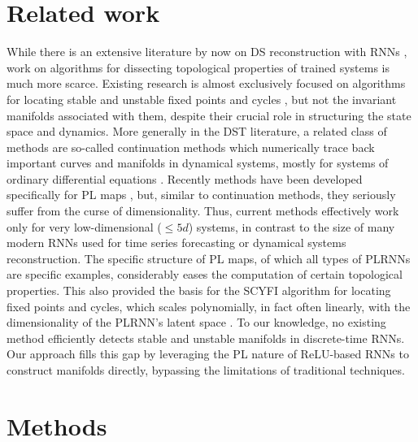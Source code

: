 \documentclass{article}
\theoremstyle{example}
\theoremstyle{plain}
\theoremstyle{definition}
\theoremstyle{remark}
\begin{document}
\section{Related work}
While there is an extensive literature by now on DS reconstruction with RNNs \citep{brenner_tractable_2022,brenner2024alrnn,hess,patel,platt2023constraining,Cestnik}, work on algorithms for dissecting topological properties of trained systems is much more scarce. Existing research is almost exclusively focused on algorithms for locating stable and unstable fixed points and cycles \citep{golub_fixedpointfinder_2018,eisenmann_bifurcations_2023}, but not the invariant manifolds associated with them, despite their crucial role in structuring the state space and dynamics. More generally in the DST literature, a related class of methods are so-called continuation methods which numerically trace back important curves and manifolds in dynamical systems, mostly for systems of ordinary differential equations \citep{krauskopf2007numerical,osinga2014computing}. Recently methods have been developed specifically for PL maps \citep{simpson2023compute}, but, similar to continuation methods, they seriously suffer from the curse of dimensionality. Thus, current methods effectively work only for very low-dimensional ($\leq 5d$) systems, in contrast to the size of many modern RNNs used for time series forecasting or dynamical systems reconstruction. The specific structure of PL maps, of which all types of PLRNNs are specific examples, considerably eases the computation of certain topological properties. This also provided the basis for the SCYFI algorithm for locating fixed points and cycles, which scales polynomially, in fact often linearly, with the dimensionality of the PLRNN's latent space \citep{eisenmann_bifurcations_2023}. To our knowledge, no existing method efficiently detects stable and unstable manifolds in discrete-time RNNs. Our approach fills this gap by leveraging the PL nature of ReLU-based RNNs to construct manifolds directly, bypassing the limitations of traditional techniques. 

\section{Methods}
\end{document}
